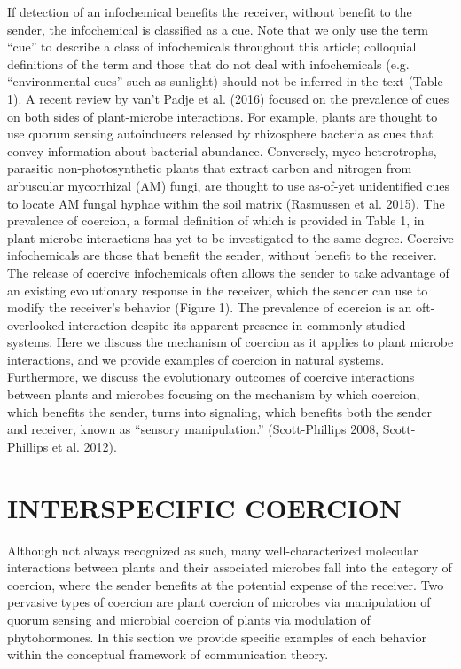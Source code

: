 \documentclass[PhD]{msu-thesis}
\begin{document}
If detection of an infochemical benefits the receiver, without benefit to the sender, the infochemical is classified as a cue. Note that we only use the term “cue” to describe a class of infochemicals throughout this article; colloquial definitions of the term and those that do not deal with infochemicals (e.g. “environmental cues” such as sunlight) should not be inferred in the text (Table 1). A recent review by van’t Padje et al. (2016) focused on the prevalence of cues on both sides of plant-microbe interactions. For example, plants are thought to use quorum sensing autoinducers released by rhizosphere bacteria as cues that convey information about bacterial abundance. Conversely, myco-heterotrophs, parasitic non-photosynthetic plants that extract carbon and nitrogen from arbuscular mycorrhizal (AM) fungi, are thought to use as-of-yet unidentified cues to locate AM fungal hyphae within the soil matrix (Rasmussen et al. 2015). 	
The prevalence of coercion, a formal definition of which is provided in Table 1, in plant microbe interactions has yet to be investigated to the same degree. Coercive infochemicals are those that benefit the sender, without benefit to the receiver. The release of coercive infochemicals often allows the sender to take advantage of an existing evolutionary response in the receiver, which the sender can use to modify the receiver’s behavior (Figure 1). The prevalence of coercion is an oft-overlooked interaction despite its apparent presence in commonly studied systems. Here we discuss the mechanism of coercion as it applies to plant microbe interactions, and we provide examples of coercion in natural systems. Furthermore, we discuss the evolutionary outcomes of coercive interactions between plants and microbes focusing on the mechanism by which coercion, which benefits the sender, turns into signaling, which benefits both the sender and receiver, known as “sensory manipulation.” (Scott-Phillips 2008, Scott-Phillips et al. 2012). 

\section{INTERSPECIFIC COERCION}
Although not always recognized as such, many well-characterized molecular interactions between plants and their associated microbes fall into the category of coercion, where the sender benefits at the potential expense of the receiver. Two pervasive types of coercion are plant coercion of microbes via manipulation of quorum sensing and microbial coercion of plants via modulation of phytohormones. In this section we provide specific examples of each behavior within the conceptual framework of communication theory. 
\end{document}
